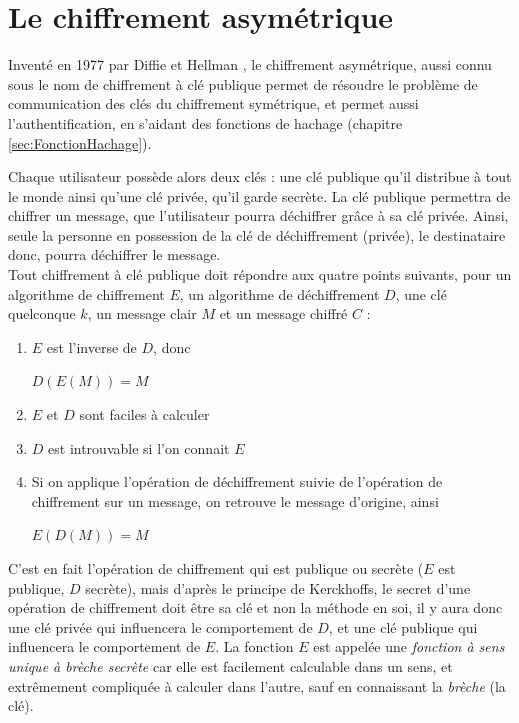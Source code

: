 \section{Le chiffrement asymétrique}
Inventé en 1977 par Diffie et Hellman
\cite{NewDirectionsInCryptography}, le chiffrement asymétrique, aussi
connu sous le nom de chiffrement à clé publique permet de résoudre le
problème de communication des clés du chiffrement symétrique, et
permet aussi l'authentification, en s'aidant des fonctions de hachage 
(chapitre \ref{sec:FonctionHachage}). 

Chaque utilisateur possède alors deux clés : une clé publique qu'il
distribue à tout le monde ainsi qu'une clé privée, qu'il garde
secrète. La clé publique permettra de chiffrer un message, que
l'utilisateur pourra déchiffrer grâce à sa clé privée. Ainsi,
seule la
personne en possession de la clé de déchiffrement (privée), le
destinataire donc, pourra déchiffrer le message. \\

Tout chiffrement à clé publique doit répondre aux quatre points
suivants, pour un algorithme de chiffrement $E$, un algorithme de
déchiffrement $D$, une clé quelconque $k$, un message clair $M$ et un
message chiffré $C$ : 
\begin{enumerate}
  \item $E$ est l'inverse de $D$, donc
    \begin{center}
      $D(E(M)) = M$
    \end{center}
  \item $E$ et $D$ sont faciles à calculer
  \item $D$ est introuvable si l'on connait $E$
  \item Si on applique l'opération de déchiffrement suivie de
    l'opération de chiffrement sur un message, on retrouve le message
    d'origine, ainsi
    \begin{center}
      $E(D(M)) = M$
    \end{center}
\end{enumerate}

C'est en fait l'opération de chiffrement qui est publique ou secrète
($E$ est publique, $D$ secrète), mais d'après le principe de
Kerckhoffs, le secret d'une opération de chiffrement doit être sa clé
et non la méthode en soi, il y aura donc une clé privée qui
influencera le comportement de $D$, et une clé publique qui
influencera le comportement de $E$. La fonction $E$ est appelée une
\emph{fonction à sens unique à brèche secrète} 
car elle est facilement calculable dans un sens, et extrêmement
compliquée à calculer dans l'autre,
sauf en connaissant la \emph{brèche} (la clé).

